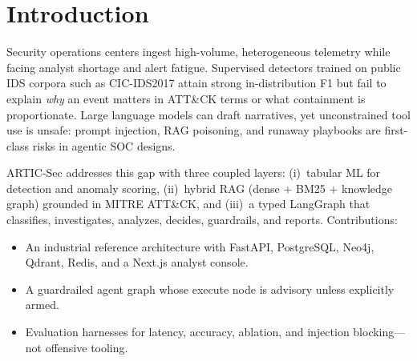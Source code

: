 \section{Introduction}

Security operations centers ingest high-volume, heterogeneous telemetry while facing analyst shortage and alert fatigue. Supervised detectors trained on public IDS corpora such as CIC-IDS2017 attain strong in-distribution F1 but fail to explain \emph{why} an event matters in ATT\&CK terms or what containment is proportionate. Large language models can draft narratives, yet unconstrained tool use is unsafe: prompt injection, RAG poisoning, and runaway playbooks are first-class risks in agentic SOC designs.

ARTIC-Sec addresses this gap with three coupled layers: (i)~tabular ML for detection and anomaly scoring, (ii)~hybrid RAG (dense + BM25 + knowledge graph) grounded in MITRE ATT\&CK, and (iii)~a typed LangGraph that classifies, investigates, analyzes, decides, guardrails, and reports. Contributions:

\begin{itemize}
  \item An industrial reference architecture with FastAPI, PostgreSQL, Neo4j, Qdrant, Redis, and a Next.js analyst console.
  \item A guardrailed agent graph whose execute node is advisory unless explicitly armed.
  \item Evaluation harnesses for latency, accuracy, ablation, and injection blocking---not offensive tooling.
\end{itemize}
